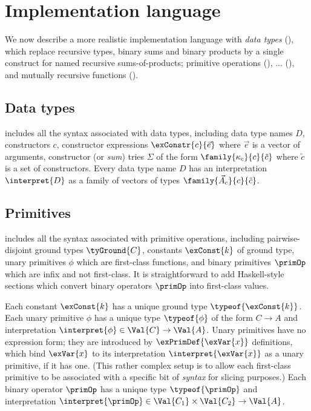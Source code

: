 \section{Implementation language}

We now describe a more realistic implementation language with \emph{data types}
(), which replace recursive types, binary
sums and binary products by a single construct for named recursive
sums-of-products; primitive operations
(), ...
(), and mutually recursive functions
().

\subsection{Data types}
\label{sec:impl-language:data-types}

 includes all the syntax associated with data
types, including data type names $D$, constructors $c$, constructor expressions
$\exConstr{c}{\vec{e}}$ where $\vec{e}$ is a vector of arguments, constructor
(or \emph{sum}) tries $\Sigma$ of the form $\family{\kappa_c}{c}{\tilde{c}}$
where $\tilde{c}$ is a set of constructors. Every data type name $D$ has an
interpretation $\interpret{D}$ as a family of vectors of types
$\family{\vec{A}_c}{c}{\tilde{c}}$.

\subsection{Primitives}
\label{sec:impl-language:primitives}




 includes all the syntax associated with primitive
operations, including pairwise-disjoint ground types $\tyGround{C}$, constants
$\exConst{k}$ of ground type, unary primitives $\phi$ which are first-class
functions, and binary primitives $\primOp$ which are infix and not first-class.
It is straightforward to add Haskell-style sections which convert binary
operators $\primOp$ into first-class values.

Each constant $\exConst{k}$ has a unique ground type $\typeof{\exConst{k}}$.
Each unary primitive $\phi$ has a unique type $\typeof{\phi}$ of the form $C \to
A$ and interpretation $\interpret{\phi} \in \Val{C} \to \Val{A}$. Unary
primitives have no expression form; they are introduced by
$\exPrimDef{\exVar{x}}$ definitions, which bind $\exVar{x}$ to its
interpretation $\interpret{\exVar{x}}$ as a unary primitive, if it has one.
(This rather complex setup is to allow each first-class primitive to be
associated with a specific bit of \emph{syntax} for slicing purposes.) Each
binary operator $\primOp$ has a unique type $\typeof{\primOp}$ and
interpretation $\interpret{\primOp} \in \Val{C_1} \times \Val{C_2} \to \Val{A}$.


